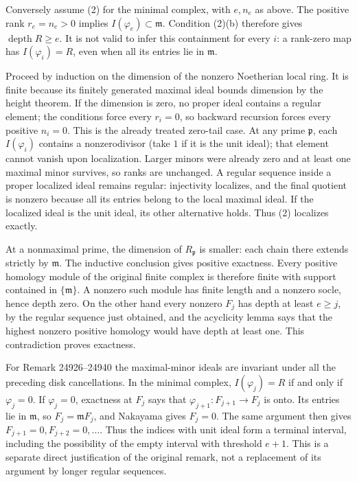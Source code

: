 Conversely assume (2) for the minimal complex, with \(e,n_e\) as above. The positive rank \(r_e=n_e>0\) implies \(I(\varphi_e)\subset\mathfrak m\). Condition (2)(b) therefore gives \(\operatorname{depth}R\ge e\). It is not valid to infer this containment for every \(i\): a rank-zero map has \(I(\varphi_i)=R\), even when all its entries lie in \(\mathfrak m\).

Proceed by induction on the dimension of the nonzero Noetherian local ring. It is finite because its finitely generated maximal ideal bounds dimension by the height theorem. If the dimension is zero, no proper ideal contains a regular element; the conditions force every \(r_i=0\), so backward recursion forces every positive \(n_i=0\). This is the already treated zero-tail case. At any prime \(\mathfrak p\), each \(I(\varphi_i)\) contains a nonzerodivisor (take \(1\) if it is the unit ideal); that element cannot vanish upon localization. Larger minors were already zero and at least one maximal minor survives, so ranks are unchanged. A regular sequence inside a proper localized ideal remains regular: injectivity localizes, and the final quotient is nonzero because all its entries belong to the local maximal ideal. If the localized ideal is the unit ideal, its other alternative holds. Thus (2) localizes exactly.

At a nonmaximal prime, the dimension of \(R_{\mathfrak p}\) is smaller: each chain there extends strictly by \(\mathfrak m\). The inductive conclusion gives positive exactness. Every positive homology module of the original finite complex is therefore finite with support contained in \(\{\mathfrak m\}\). A nonzero such module has finite length and a nonzero socle, hence depth zero. On the other hand every nonzero \(F_j\) has depth at least \(e\ge j\), by the regular sequence just obtained, and the acyclicity lemma says that the highest nonzero positive homology would have depth at least one. This contradiction proves exactness.

For Remark 24926--24940 the maximal-minor ideals are invariant under all the preceding disk cancellations. In the minimal complex, \(I(\varphi_j)=R\) if and only if \(\varphi_j=0\). If \(\varphi_j=0\), exactness at \(F_j\) says that \(\varphi_{j+1}:F_{j+1}\to F_j\) is onto. Its entries lie in \(\mathfrak m\), so \(F_j=\mathfrak m F_j\), and Nakayama gives \(F_j=0\). The same argument then gives \(F_{j+1}=0,F_{j+2}=0,\ldots\). Thus the indices with unit ideal form a terminal interval, including the possibility of the empty interval with threshold \(e+1\). This is a separate direct justification of the original remark, not a replacement of its argument by longer regular sequences.

